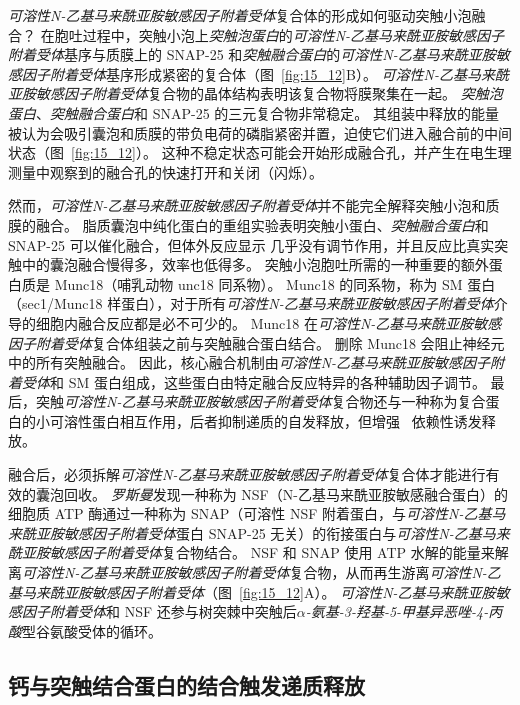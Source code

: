 \textit{可溶性N-乙基马来酰亚胺敏感因子附着受体}复合体的形成如何驱动突触小泡融合？
在胞吐过程中，突触小泡上\textit{突触泡蛋白}的\textit{可溶性N-乙基马来酰亚胺敏感因子附着受体}基序与质膜上的 SNAP-25 和\textit{突触融合蛋白}的\textit{可溶性N-乙基马来酰亚胺敏感因子附着受体}基序形成紧密的复合体（图~\ref{fig:15_12}B）。
\textit{可溶性N-乙基马来酰亚胺敏感因子附着受体}复合物的晶体结构表明该复合物将膜聚集在一起。
\textit{突触泡蛋白}、\textit{突触融合蛋白}和 SNAP-25 的三元复合物非常稳定。
其组装中释放的能量被认为会吸引囊泡和质膜的带负电荷的磷脂紧密并置，迫使它们进入融合前的中间状态（图~\ref{fig:15_12}）。
这种不稳定状态可能会开始形成融合孔，并产生在电生理测量中观察到的融合孔的快速打开和关闭（闪烁）。


然而，\textit{可溶性N-乙基马来酰亚胺敏感因子附着受体}并不能完全解释突触小泡和质膜的融合。
脂质囊泡中纯化蛋白的重组实验表明突触小蛋白、\textit{突触融合蛋白}和 SNAP-25 可以催化融合，但体外反应显示  几乎没有调节作用，并且反应比真实突触中的囊泡融合慢得多，效率也低得多。
突触小泡胞吐所需的一种重要的额外蛋白质是 Munc18（哺乳动物 unc18 同系物）。 
Munc18 的同系物，称为 SM 蛋白（sec1/Munc18 样蛋白），对于所有\textit{可溶性N-乙基马来酰亚胺敏感因子附着受体}介导的细胞内融合反应都是必不可少的。
Munc18 在\textit{可溶性N-乙基马来酰亚胺敏感因子附着受体}复合体组装之前与突触融合蛋白结合。
删除 Munc18 会阻止神经元中的所有突触融合。
因此，核心融合机制由\textit{可溶性N-乙基马来酰亚胺敏感因子附着受体}和 SM 蛋白组成，这些蛋白由特定融合反应特异的各种辅助因子调节。
最后，突触\textit{可溶性N-乙基马来酰亚胺敏感因子附着受体}复合物还与一种称为复合蛋白的小可溶性蛋白相互作用，后者抑制递质的自发释放，但增强~ 依赖性诱发释放。


融合后，必须拆解\textit{可溶性N-乙基马来酰亚胺敏感因子附着受体}复合体才能进行有效的囊泡回收。
\textit{罗斯曼}发现一种称为 NSF（N-乙基马来酰亚胺敏感融合蛋白）的细胞质 ATP 酶通过一种称为 SNAP（可溶性 NSF 附着蛋白，与\textit{可溶性N-乙基马来酰亚胺敏感因子附着受体}蛋白 SNAP-25 无关）的衔接蛋白与\textit{可溶性N-乙基马来酰亚胺敏感因子附着受体}复合物结合。
NSF 和 SNAP 使用 ATP 水解的能量来解离\textit{可溶性N-乙基马来酰亚胺敏感因子附着受体}复合物，从而再生游离\textit{可溶性N-乙基马来酰亚胺敏感因子附着受体}（图~\ref{fig:15_12}A）。
\textit{可溶性N-乙基马来酰亚胺敏感因子附着受体}和 NSF 还参与树突棘中突触后\textit{$\alpha$-氨基-3-羟基-5-甲基异恶唑-4-丙酸}型谷氨酸受体的循环。



\subsection{钙与突触结合蛋白的结合触发递质释放}

